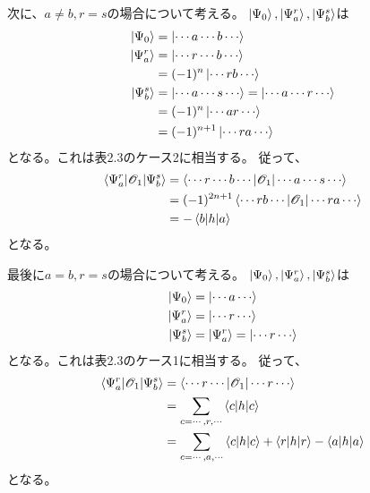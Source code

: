次に、$a\neq b, r=s$の場合について考える。
$\ket{\Psi_0},\ket{\Psi_{a}^{r}},\ket{\Psi_{b}^{s}}$は
\begin{align}
	\ket{\Psi_0}
&=
	\ket{\cdots a\cdots b\cdots} \\
%
%
	\ket{\Psi_{a}^{r}}
&=
	\ket{\cdots r\cdots b\cdots} \\
%
&=
	(-1)^n \ket{\cdots rb\cdots} \\
%
%
	\ket{\Psi_{b}^{s}}
&=
	\ket{\cdots a\cdots s\cdots}
=
	\ket{\cdots a\cdots r\cdots} \\
%
&=
	(-1)^n \ket{\cdots ar\cdots} \\
%
&=
	(-1)^{n+1} \ket{\cdots ra\cdots}
\end{align}
となる。これは表2.3のケース2に相当する。
従って、
\begin{align}
	\braket{\Psi_{a}^{r}|\mathscr{O}_1|\Psi_{b}^{s}}
&=
	\braket{\cdots r\cdots b\cdots|\mathscr{O}_1|\cdots a\cdots s\cdots} \\
%
%
&=
	(-1)^{2n+1}
	\braket{\cdots rb\cdots|\mathscr{O}_1|\cdots ra\cdots} \\
%
%
&=
	-\braket{b|h|a}
\end{align}
となる。

最後に$a=b, r=s$の場合について考える。
$\ket{\Psi_0},\ket{\Psi_{a}^{r}},\ket{\Psi_{b}^{s}}$は
\begin{align}
	\ket{\Psi_0}
&=
	\ket{\cdots a\cdots} \\
%
%
	\ket{\Psi_{a}^{r}}
&=
	\ket{\cdots r\cdots} \\
%
%
	\ket{\Psi_{b}^{s}}
&=
	\ket{\Psi_{a}^{r}}
=
	\ket{\cdots r\cdots}
\end{align}
となる。これは表2.3のケース1に相当する。
従って、
\begin{align}
	\braket{\Psi_{a}^{r}|\mathscr{O}_1|\Psi_{b}^{s}}
&=
	\braket{\cdots r\cdots|\mathscr{O}_1|\cdots r\cdots} \\
%
%
&=
	\sum_{c=\cdots,r,\cdots}
		\braket{c|h|c} \\
%
%
&=
	\sum_{c=\cdots,a,\cdots}
		\braket{c|h|c}
	+
	\braket{r|h|r}
	-
	\braket{a|h|a}
\end{align}
となる。

